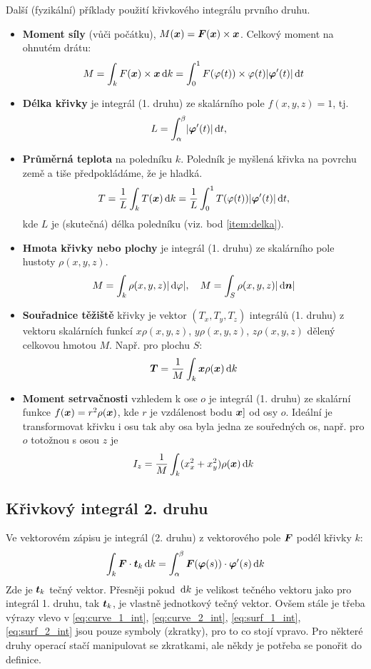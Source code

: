 Další (fyzikální) příklady použití křivkového integrálu prvního druhu.
\begin{itemize}
 \item {\bf Moment síly} (vůči počátku), $M(\mathbf{\boldsymbol{x}}) = \mathbf{\boldsymbol{F}}(\mathbf{\boldsymbol{x}}) \times \mathbf{\boldsymbol{x}}$. Celkový moment na ohnutém drátu:
 \[
    M = \int_k F(\mathbf{\boldsymbol{x}})\times \mathbf{\boldsymbol{x}} \,{\rm d} k = \int_0^1 F(\varphi(t))\times \varphi(t) \lvert\mathbf{\boldsymbol{\varphi}}'(t)\rvert \,{\rm d} t
 \]
 \item \label{item:delka} {\bf Délka křivky} je integrál (1. druhu) ze skalárního pole $f(x,y,z)=1$, tj.
\[
   L=\int_\alpha^\beta \lvert\mathbf{\boldsymbol{\varphi}}'(t)\rvert \,{\rm d}{t},\quad 
\]
 \item {\bf Průměrná teplota} na poledníku $k$. Poledník je myšlená křivka na povrchu země a tiše předpokládáme, že je hladká.
 \[
    T = \frac{1}{L}\int_k T(\mathbf{\boldsymbol{x}}) \,{\rm d} k = \frac{1}{L}\int_0^1 T(\varphi(t)) \lvert\mathbf{\boldsymbol{\varphi}}'(t)\rvert \,{\rm d} t,
 \]
 kde $L$ je (skutečná) délka poledníku (viz. bod \ref{item:delka}).
 \item {\bf Hmota křivky nebo plochy} je integrál (1. druhu) ze skalárního pole hustoty $\rho(x,y,z)$.
\[
        M=\int_k \rho(x,y,z) \lvert\,{\rm d} \varphi\rvert,\quad M=\int_S \rho(x,y,z) \lvert\,{\rm d} \mathbf{\boldsymbol{n}}\rvert
\]
\item {\bf Souřadnice těžiště} křivky je vektor $(T_x,T_y,T_z)$ integrálů (1. druhu) z vektoru skalárních funkcí 
       $x\rho(x,y,z)$, $ y \rho(x,y,z)$, $z\rho(x,y,z)$ dělený celkovou hmotou $M$. Např. pro plochu $S$:
\[
        \mathbf{\boldsymbol{T}}=\frac{1}{M} \int_k \mathbf{\boldsymbol{x}} \rho(\mathbf{\boldsymbol{x}}) \,{\rm d} k
\]

\item {\bf Moment setrvačnosti} vzhledem k ose $o$ je integrál (1. druhu) ze skalární funkce
$f(\mathbf{\boldsymbol{x}})=r^2\rho(\mathbf{\boldsymbol{x}})$, kde $r$ je vzdálenost bodu $\mathbf{\boldsymbol{x}}]$ od osy $o$. Ideální je transformovat křivku i osu tak aby osa 
byla jedna ze souředných os, např. pro $o$ totožnou s osou $z$ je
\[
    I_z = \frac{1}{M} \int_k (x_x^2 + x_y^2) \rho(\mathbf{\boldsymbol{x}}) \,{\rm d} k
\]




\end{itemize}


\subsection{Křivkový integrál 2. druhu}
Ve vektorovém zápisu je integrál (2. druhu) z vektorového pole $\mathbf{\boldsymbol{F}}$ podél křivky $k$:
\begin{equation}
\label{eq:cureve_2_int}
 \int_k \mathbf{\boldsymbol{F}} \cdot \mathbf{\boldsymbol{t}}_k \,{\rm d} k = \int_\alpha^\beta \mathbf{\boldsymbol{F}}( \mathbf{\boldsymbol{\varphi}}(s) ) \cdot \mathbf{\boldsymbol{\varphi}}'(s) \,{\rm d} k
\end{equation}
Zde je $\mathbf{\boldsymbol{t}}_k$ tečný vektor. Přesněji pokud $\,{\rm d} k$ je velikost tečného vektoru jako pro integrál 1. druhu, tak $\mathbf{\boldsymbol{t}}_k$, je vlastně jednotkový tečný vektor.
Ovšem stále je třeba výrazy vlevo v \eqref{eq:curve_1_int}, \eqref{eq:curve_2_int}, \eqref{eq:surf_1_int}, \eqref{eq:surf_2_int} jsou pouze symboly (zkratky), 
pro to co stojí vpravo. Pro některé druhy operací stačí manipulovat se zkratkami, ale někdy je potřeba se ponořit do definice.

